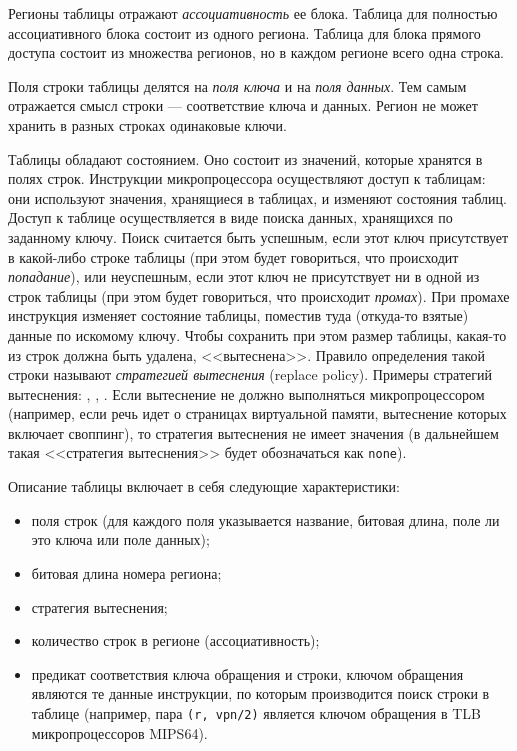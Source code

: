 Регионы таблицы отражают \emph{ассоциативность} ее блока. Таблица для полностью
ассоциативного блока состоит из одного региона. Таблица для блока прямого
доступа состоит из множества регионов, но в каждом регионе всего одна строка.

Поля строки таблицы делятся на \emph{поля ключа} и на \emph{поля данных}. Тем
самым отражается смысл строки --- соответствие ключа и данных. Регион не может
хранить в разных строках одинаковые ключи.

Таблицы обладают состоянием. Оно состоит из значений, которые хранятся в полях
строк. Инструкции микропроцессора осуществляют доступ к таблицам: они используют
значения, хранящиеся в таблицах, и изменяют состояния таблиц. Доступ к таблице
осуществляется в виде поиска данных, хранящихся по заданному ключу. Поиск считается
быть успешным, если этот ключ присутствует в какой-либо строке таблицы (при этом
будет говориться, что происходит \emph{попадание}), или неуспешным, если этот
ключ не присутствует ни в одной из строк таблицы (при этом будет говориться, что
происходит \emph{промах}). При промахе инструкция изменяет состояние
таблицы, поместив туда (откуда-то взятые) данные по искомому ключу. Чтобы
сохранить при этом размер таблицы, какая-то из строк должна быть удалена,
<<вытеснена>>. Правило определения такой строки называют \emph{стратегией
вытеснения} (replace policy). Примеры стратегий вытеснения: \LRU, \FIFO,
\PseudoLRU. Если вытеснение не должно выполняться микропроцессором (например,
если речь идет о страницах виртуальной памяти, вытеснение которых включает своппинг), то стратегия вытеснения не имеет значения (в дальнейшем такая <<стратегия вытеснения>> будет обозначаться как \texttt{none}).

Описание таблицы включает в себя следующие характеристики:
\begin{itemize}
    \item поля строк (для каждого поля указывается название, битовая длина, поле
ли это ключа или поле данных);
    \item битовая длина номера региона;
    \item стратегия вытеснения;
    \item количество строк в регионе (ассоциативность);
    \item предикат соответствия ключа обращения и строки, ключом обращения
являются те данные инструкции, по которым производится поиск строки в таблице
(например, пара \texttt{(r, vpn/2)} является ключом обращения в TLB
микропроцессоров MIPS64).
\end{itemize}

